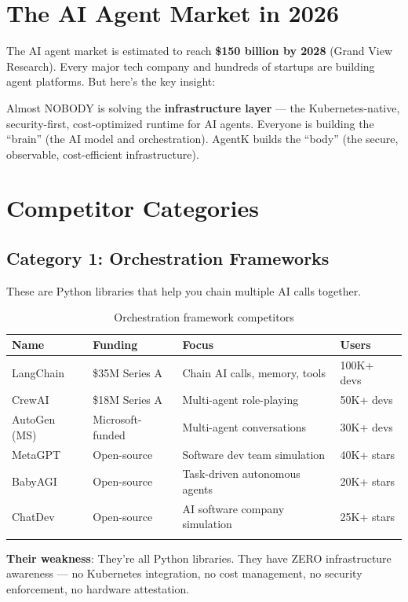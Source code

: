 \documentclass[12pt,a4paper,openany]{report}
\begin{document}
\section{The AI Agent Market in 2026}

The AI agent market is estimated to reach \textbf{\$150 billion by 2028} (Grand View Research). Every major tech company and hundreds of startups are building agent platforms. But here's the key insight:

\begin{moneybox}
Almost NOBODY is solving the \textbf{infrastructure layer} — the Kubernetes-native, security-first, cost-optimized runtime for AI agents. Everyone is building the ``brain'' (the AI model and orchestration). AgentK builds the ``body'' (the secure, observable, cost-efficient infrastructure).
\end{moneybox}

\section{Competitor Categories}

\subsection{Category 1: Orchestration Frameworks}

These are Python libraries that help you chain multiple AI calls together.

\begin{longtable}{p{3cm}p{3cm}p{4cm}p{3cm}}
\toprule
\textbf{Name} & \textbf{Funding} & \textbf{Focus} & \textbf{Users} \\
\midrule
LangChain & \$35M Series A & Chain AI calls, memory, tools & 100K+ devs \\
CrewAI & \$18M Series A & Multi-agent role-playing & 50K+ devs \\
AutoGen (MS) & Microsoft-funded & Multi-agent conversations & 30K+ devs \\
MetaGPT & Open-source & Software dev team simulation & 40K+ stars \\
BabyAGI & Open-source & Task-driven autonomous agents & 20K+ stars \\
ChatDev & Open-source & AI software company simulation & 25K+ stars \\
\bottomrule
\caption{Orchestration framework competitors}
\end{longtable}

\textbf{Their weakness}: They're all Python libraries. They have ZERO infrastructure awareness — no Kubernetes integration, no cost management, no security enforcement, no hardware attestation.
\end{document}
